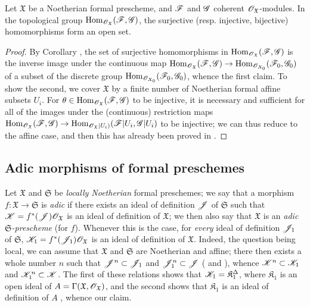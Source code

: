 \begin{proposition}[10.11.9]
\label{1.10.11.9}
Let $\mathfrak{X}$ be a Noetherian formal prescheme, and $\mathscr{F}$ and $\mathscr{G}$ coherent $\mathscr{O}_\mathfrak{X}$-modules.
In the topological group $\operatorname{Hom}_{\mathscr{O}_\mathfrak{X}}(\mathscr{F},\mathscr{G})$, the surjective (resp. injective, bijective) homomorphisms form an open set.
\end{proposition}

\begin{proof}
\label{proof-1.10.11.9}
By Corollary , the set of surjective homomorphisms in $\operatorname{Hom}_{\mathscr{O}_\mathfrak{X}}(\mathscr{F},\mathscr{G})$ is the inverse image under the continuous map $\Hom_{\sh{O}_\mathfrak{X}}(\sh{F},\sh{G})\to\Hom_{\sh{O}_{X_0}}(\sh{F}_0,\sh{G}_0)$ of a subset of the discrete group $\operatorname{Hom}_{\mathscr{O}_{X_0}}(\mathscr{F}_0,\mathscr{G}_0)$, whence the first claim.
To show the second, we cover $\mathfrak{X}$ by a finite number of Noetherian formal affine subsets $U_i$.
For $\theta\in\operatorname{Hom}_{\mathscr{O}_\mathfrak{X}}(\mathscr{F},\mathscr{G})$ to be injective, it is necessary and sufficient for all of the images under the (continuous) restriction maps $\Hom_{\sh{O}_\mathfrak{X}}(\sh{F},\sh{G})\to\Hom_{\sh{O}_\mathfrak{X}|U_i)}(\sh{F}|U_i,\sh{G}|U_i)$ to be injective; we can thus reduce to the affine case, and then this has already been proved in .
\end{proof}

\subsection{Adic morphisms of formal preschemes}
\label{subsection:1.10.12}

\begin{env}[10.12.1]
\label{1.10.12.1}
Let $\mathfrak{X}$ and $\mathfrak{S}$ be \emph{locally Noetherian} formal preschemes;
we say that a morphism $f:\mathfrak{X}\to\mathfrak{S}$ is \emph{adic} if there exists an ideal of definition $\mathscr{J}$ of $\mathfrak{S}$ such that $\mathscr{K}=f^*(\mathscr{J})\mathscr{O}_\mathfrak{X}$ is an ideal of definition of $\mathfrak{X}$;
we then also say that $\mathfrak{X}$ is an \emph{adic $\mathfrak{S}$-prescheme} (for $f$).
Whenever this is the case, for \emph{every} ideal of definition $\mathscr{J}_1$ of $\mathfrak{S}$, $\mathscr{K}_1=f^*(\mathscr{J}_1)\mathscr{O}_\mathfrak{X}$ is an ideal of definition of $\mathfrak{X}$.
Indeed, the question being local, we can assume that $\mathfrak{X}$ and $\mathfrak{S}$ are Noetherian and affine;
there then exists a whole number $n$ such that $\mathscr{J}^n\subset\mathscr{J}_1$ and $\mathscr{J}_1^n\subset\mathscr{J}$ ( and ), whence $\mathscr{K}^n\subset\mathscr{K}_1$ and $\mathscr{K}_1^n\subset\mathscr{K}$.
The first of these relations shows that $\mathscr{K}_1=\mathfrak{K}_1^\Delta$, where $\mathfrak{K}_1$ is an open ideal of $A=\Gamma(\mathfrak{X},\mathscr{O}_\mathfrak{X})$, and the second shows that $\mathfrak{K}_1$ is an ideal of definition of $A$ , whence our claim.
\end{env}

